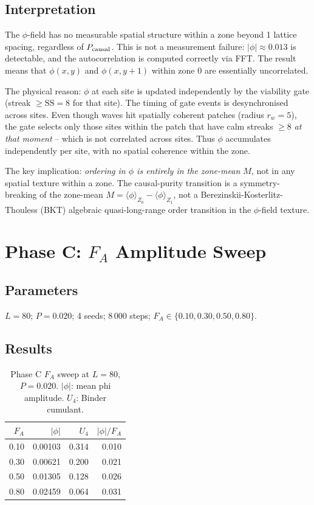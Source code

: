 \documentclass[12pt,a4paper]{article}
\begin{document}
\subsection{Interpretation}

The $\phi$-field has no measurable spatial structure within a zone beyond
1 lattice spacing, regardless of $P_{\rm causal}$.
This is not a measurement failure: $|\phi| \approx 0.013$ is detectable,
and the autocorrelation is computed correctly via FFT.
The result means that $\phi(x, y)$ and $\phi(x, y+1)$ within zone 0
are essentially uncorrelated.

The physical reason: $\phi$ at each site is updated independently by the
viability gate (streak $\ge \mathrm{SS}=8$ for that site).
The timing of gate events is desynchronised across sites.
Even though waves hit spatially coherent patches (radius $r_w=5$),
the gate selects only those sites within the patch that have calm streaks
$\ge 8$ \emph{at that moment} -- which is not correlated across sites.
Thus $\phi$ accumulates independently per site, with no spatial coherence
within the zone.

The key implication: \emph{ordering in $\phi$ is entirely in the zone-mean $M$},
not in any spatial texture within a zone.
The causal-purity transition is a symmetry-breaking of the zone-mean
$M = \langle\phi\rangle_{Z_0} - \langle\phi\rangle_{Z_1}$, not a
Berezinskii-Kosterlitz-Thouless (BKT) algebraic quasi-long-range order
transition in the $\phi$-field texture.

\section{Phase C: $F_A$ Amplitude Sweep}

\subsection{Parameters}

$L=80$; $P=0.020$; 4 seeds; 8\,000 steps;
$F_A \in \{0.10, 0.30, 0.50, 0.80\}$.

\subsection{Results}

\begin{table}[h]
\centering
\caption{Phase C $F_A$ sweep at $L=80$, $P=0.020$.
$|\phi|$: mean phi amplitude. $U_4$: Binder cumulant.}
\label{tab:phaseC}
\begin{tabular}{rrrr}
\toprule
$F_A$ & $|\phi|$ & $U_4$ & $|\phi| / F_A$ \\
\midrule
0.10 & 0.00103 & 0.314 & 0.010 \\
0.30 & 0.00621 & 0.200 & 0.021 \\
0.50 & 0.01305 & 0.128 & 0.026 \\
0.80 & 0.02459 & 0.064 & 0.031 \\
\bottomrule
\end{tabular}
\end{table}
\end{document}
